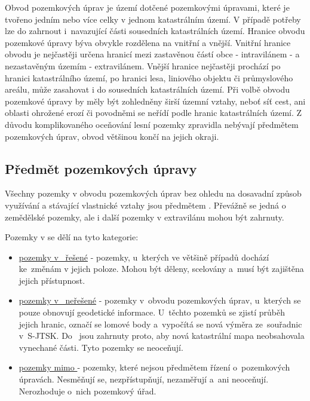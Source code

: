 Obvod pozemkových úprav je území dotčené pozemkovými úpravami, které je tvořeno jedním nebo více celky v jednom katastrálním území. V případě potřeby lze do  zahrnout i~navazující části sousedních katastrálních území. Hranice obvodu pozemkové úpravy býva obvykle rozdělena na vnitřní a vnější. Vnitřní hranice obvodu je nejčastěji určena hranicí mezi zastavěnou částí obce - intravilánem - a nezastavěným územím - extravilánem. Vnější hranice nejčastěji prochází po hranici katastrálního území, po hranici lesa, liniového objektu či průmyslového areálu, může zasahovat i do sousedních katastrálních území. Při volbě obvodu pozemkové úpravy by měly být zohledněny širší územní vztahy, neboť síť cest, ani oblasti ohrožené erozí či povodněmi se neřídí podle hranic katastrálních území. Z důvodu komplikovaného oceňování lesní pozemky zpravidla nebývají předmětem pozemkových úprav, obvod většinou končí na jejich okraji.

\subsection{Předmět pozemkových úpravy}
\label{predmet_pu}

Všechny pozemky v obvodu pozemkových úprav bez ohledu na dosavadní způsob využívání a stávající vlastnické vztahy jsou předmětem . Převážně se jedná o zemědělské pozemky, ale i další pozemky v extravilánu mohou být zahrnuty.

Pozemky v  se dělí na tyto kategorie:
	\begin{itemize}[leftmargin=1.5cm]
		\item \underline{pozemky v~ řešené} - pozemky, u~kterých ve většině případů dochází ke~změnám v jejich poloze. Mohou být děleny, scelovány a~musí být zajištěna jejich přístupnost.
		\item \underline{pozemky v~ neřešené} - pozemky v~obvodu pozemkových úprav, u~kterých se pouze obnovují geodetické informace. U~těchto pozemků se zjistí průběh jejich hranic, označí se lomové body a~vypočítá se nová výměra ze~souřadnic v~S-JTSK. Do~ jsou zahrnuty proto, aby nová katastrální mapa neobsahovala vynechané části. Tyto pozemky se neoceňují.
		\item \underline{pozemky mimo } - pozemky, které nejsou předmětem řízení o~pozemkových úpravách. Nesměňují se, nezpřístupňují, nezaměřují a~ani neoceňují. Nerozhoduje o~nich pozemkový úřad.
	\end{itemize}

